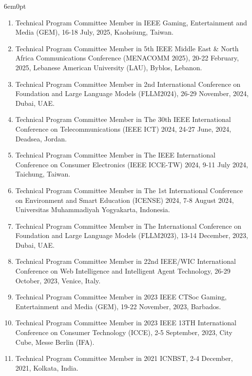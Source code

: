 \documentclass[11pt,a4paper]{moderncv}
\begin{document}
\begin{adjustwidth}{6em}{0pt}
\begin{enumerate}
		\item Technical Program Committee Member in IEEE Gaming, Entertainment and Media (GEM), 16-18 July, 2025, Kaohsiung, Taiwan.
		
		\item Technical Program Committee Member in 5th IEEE Middle East \& North Africa Communications Conference (MENACOMM 2025), 20-22 February, 2025, Lebanese American University (LAU), Byblos, Lebanon.
		
		\item Technical Program Committee Member in 2nd International Conference on Foundation and Large Language Models (FLLM2024), 26-29 November, 2024, Dubai, UAE.
		
		\item Technical Program Committee Member in The 30th IEEE International Conference on Telecommunications (IEEE ICT) 2024, 24-27 June, 2024, Deadsea, Jordan.
		
		\item Technical Program Committee Member in The IEEE International Conference on Consumer Electronics (IEEE ICCE-TW) 2024, 9-11 July 2024, Taichung, Taiwan.
		
		\item Technical Program Committee Member in The 1st International Conference on Environment and Smart Education (ICENSE) 2024, 7-8 August 2024, Universitas Muhammadiyah Yogyakarta, Indonesia.
		
		\item Technical Program Committee Member in The International Conference on Foundation and Large Language Models (FLLM2023), 13-14 December, 2023, Dubai, UAE.
		
		\item Technical Program Committee Member in 22nd IEEE/WIC International Conference on Web Intelligence and Intelligent Agent Technology, 26-29 October, 2023, Venice, Italy.
		
		\item Technical Program Committee Member in 2023 IEEE CTSoc Gaming, Entertainment and Media (GEM), 19-22 November, 2023, Barbados.
		
		\item Technical Program Committee Member in 2023 IEEE 13TH International Conference on Consumer Technology (ICCE), 2-5 September, 2023, City Cube, Messe Berlin (IFA).
		
		\item Technical Program Committee Member in 2021 ICNBST, 2-4 December, 2021, Kolkata, India.
		

\end{enumerate}
\end{adjustwidth}
\end{document}
